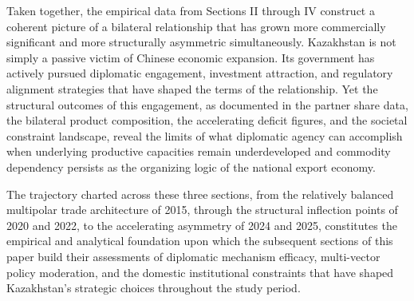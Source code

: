 \documentclass[12pt]{article}
\begin{document}
Taken together, the empirical data from Sections II through IV construct a coherent picture of a bilateral relationship that has grown more commercially significant and more structurally asymmetric simultaneously. Kazakhstan is not simply a passive victim of Chinese economic expansion. Its government has actively pursued diplomatic engagement, investment attraction, and regulatory alignment strategies that have shaped the terms of the relationship. Yet the structural outcomes of this engagement, as documented in the partner share data, the bilateral product composition, the accelerating deficit figures, and the societal constraint landscape, reveal the limits of what diplomatic agency can accomplish when underlying productive capacities remain underdeveloped and commodity dependency persists as the organizing logic of the national export economy.\par

The trajectory charted across these three sections, from the relatively balanced multipolar trade architecture of 2015, through the structural inflection points of 2020 and 2022, to the accelerating asymmetry of 2024 and 2025, constitutes the empirical and analytical foundation upon which the subsequent sections of this paper build their assessments of diplomatic mechanism efficacy, multi-vector policy moderation, and the domestic institutional constraints that have shaped Kazakhstan's strategic choices throughout the study period.\par
\end{document}
